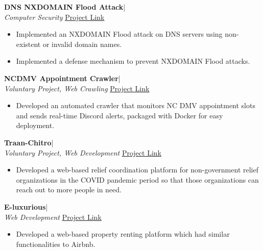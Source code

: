 \documentclass[10pt]{article}
\begin{document}
\textbf{\large DNS NXDOMAIN Flood Attack}| 
\\[0.05cm]
\emph{Computer Security} \hfill {\href{https://github.com/atiqur-rahman-0041/DNS-NXDOMAIN-FLood-Attack} {\underline{Project Link} }}
\\[-0.6cm]
	\begin{itemize}[itemsep = -0.75 mm, leftmargin=*]
	\item[{\color[RGB]{10,0,254}$\bullet$}] \noindent Implemented an NXDOMAIN Flood attack on DNS servers using non-existent or invalid domain names. 
        \item[{\color[RGB]{10,0,254}$\bullet$}] \noindent Implemented a defense mechanism to prevent NXDOMAIN Flood attacks. 
	\end{itemize}
\textbf{\large NCDMV Appointment Crawler}|  
\\[0.05cm]
\emph{Voluntary Project, Web Crawling} \hfill {\href{https://github.com/atiqur-rahman-0041/NC-DMV-Crawler}{\underline{Project Link} }} 
\\[-0.6cm]
	\begin{itemize}[itemsep = -0.75 mm, leftmargin=*]
	\item[{\color[RGB]{10,0,254}$\bullet$}] \noindent Developed an automated crawler that monitors NC DMV appointment slots and sends real-time Discord alerts, packaged with Docker for easy deployment.
	\end{itemize} 
\textbf{\large Traan-Chitro}|  
\\[0.05cm]
\emph{Voluntary Project, Web Development} \hfill {\href{https://github.com/ags3927/traan-chitro}{\underline{Project Link} }} 
\\[-0.6cm]
	\begin{itemize}[itemsep = -0.75 mm, leftmargin=*]
	\item[{\color[RGB]{10,0,254}$\bullet$}] \noindent Developed a web-based relief coordination platform for non-government relief organizations in the COVID pandemic period so that those organizations can reach out to more people in need.
	\end{itemize} 
   \textbf{\large E-luxurious}|  
\\[0.05cm]
\emph{Web Development} \hfill {\href{https://github.com/atiqur-rahman-0041/E-Luxurious-backend}{\underline{Project Link} }} 
\\[-0.6cm]
	\begin{itemize}[itemsep = -0.75 mm, leftmargin=*]
	\item[{\color[RGB]{10,0,254}$\bullet$}] \noindent Developed a web-based property renting platform which had similar functionalities to Airbnb.
	\end{itemize}
\end{document}
